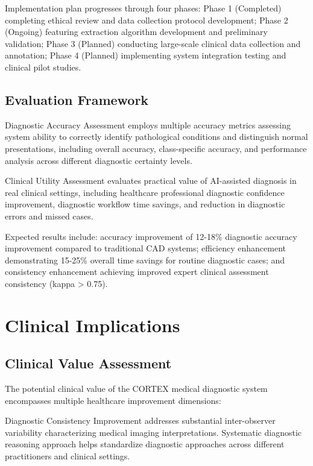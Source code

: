 Implementation plan progresses through four phases: Phase 1 (Completed) completing ethical review and data collection protocol development; Phase 2 (Ongoing) featuring extraction algorithm development and preliminary validation; Phase 3 (Planned) conducting large-scale clinical data collection and annotation; Phase 4 (Planned) implementing system integration testing and clinical pilot studies.

\subsection{Evaluation Framework}

Diagnostic Accuracy Assessment employs multiple accuracy metrics assessing system ability to correctly identify pathological conditions and distinguish normal presentations, including overall accuracy, class-specific accuracy, and performance analysis across different diagnostic certainty levels.

Clinical Utility Assessment evaluates practical value of AI-assisted diagnosis in real clinical settings, including healthcare professional diagnostic confidence improvement, diagnostic workflow time savings, and reduction in diagnostic errors and missed cases.

Expected results include: accuracy improvement of 12-18\% diagnostic accuracy improvement compared to traditional CAD systems; efficiency enhancement demonstrating 15-25\% overall time savings for routine diagnostic cases; and consistency enhancement achieving improved expert clinical assessment consistency (kappa > 0.75).

\section{Clinical Implications}

\subsection{Clinical Value Assessment}

The potential clinical value of the CORTEX medical diagnostic system encompasses multiple healthcare improvement dimensions:

Diagnostic Consistency Improvement addresses substantial inter-observer variability characterizing medical imaging interpretations. Systematic diagnostic reasoning approach helps standardize diagnostic approaches across different practitioners and clinical settings.

